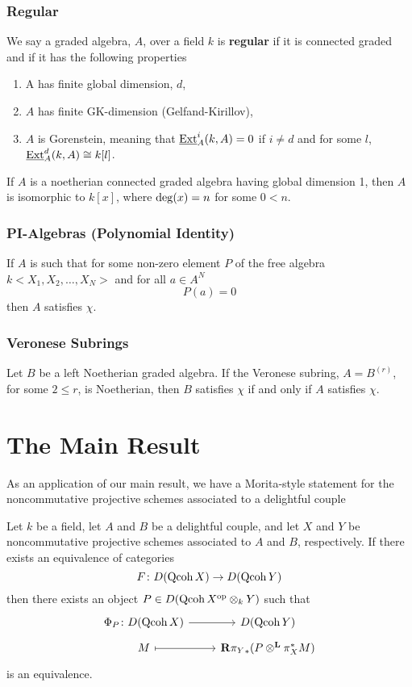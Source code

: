 \documentclass[reqno, 12pt]{amsart}
\begin{document}
\subsubsection{\cite{AS} Regular}
We say a graded algebra, $A$, over a field $k$ is \textbf{regular} if it is connected graded and if it has the following properties
\begin{enumerate}
\item
  A has finite global dimension, $d$,
\item
  $A$ has finite GK-dimension (Gelfand-Kirillov),
\item
  $A$ is Gorenstein, meaning that $\underline{\operatorname{Ext}}^i_A(k,A) = 0$ if $i \neq d$ and for some $l$, $\underline{\operatorname{Ext}}^d_A(k,A) \cong k[l]$.
\end{enumerate}

\begin{remark}
  If $A$ is a noetherian connected graded algebra having global dimension 1, then $A$ is isomorphic to $k[x]$, where $\operatorname{deg}(x) = n$ for some $0 < n$.
\end{remark}

\subsubsection{PI-Algebras (Polynomial Identity)}
If $A$ is such that for some non-zero element $P$ of the free algebra $k<X_1, X_2, \ldots, X_N>$ and for all $a \in A^N$
$$P(a) = 0$$
then $A$ satisfies $\chi$.

\subsubsection{Veronese Subrings}
Let $B$ be a left Noetherian graded algebra.
If the Veronese subring, $A = B^{(r)}$, for some $2 \leq r$, is Noetherian, then $B$ satisfies $\chi$ if and only if $A$ satisfies $\chi$.
\section{The Main Result}
As an application of our main result, we have a Morita-style statement for the noncommutative projective schemes associated to a delightful couple
\begin{theorem}[Ballard, F.]
  Let $k$ be a field, let $A$ and $B$ be a delightful couple, and let $X$ and $Y$ be noncommutative projective schemes associated to $A$ and $B$, respectively.
  If there exists an equivalence of categories
  $$F \colon D(\operatorname{Qcoh}X) \to D(\operatorname{Qcoh}Y)$$
  then there exists an object $P \in D(\operatorname{Qcoh}X^{\operatorname{op}} \otimes_k Y)$ such that
  $$\begin{tikzcd}[row sep=tiny]
    \Phi_P \colon D(\Qcoh{X}) \arrow{r}& D(\Qcoh{Y})\\
    M \arrow[mapsto]{r} & \mathbf{R}{\pi_Y}_\ast(P \otimes^\mathbf{L} \pi_X^\ast M)
  \end{tikzcd}$$
  is an equivalence.
\end{theorem}
\end{document}
